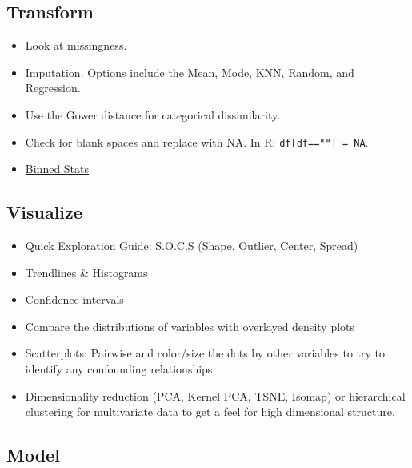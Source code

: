 \documentclass[]{book}
\theoremstyle{definition}
\theoremstyle{definition}
\theoremstyle{definition}
\theoremstyle{remark}
\begin{document}
\subsection{Transform}\label{transform}

\begin{itemize}
\item
  Look at missingness.
\item
  Imputation. Options include the Mean, Mode, KNN, Random, and
  Regression.
\item
  Use the Gower distance for categorical dissimilarity.
\item
  Check for blank spaces and replace with NA. In R:
  \texttt{df{[}df==""{]}\ =\ NA}.
\item
  \href{https://docs.scipy.org/doc/scipy-0.16.0/reference/generated/scipy.stats.binned_statistic.html}{Binned
  Stats}
\end{itemize}

\subsection{Visualize}\label{visualize}

\begin{itemize}
\item
  Quick Exploration Guide: S.O.C.S (Shape, Outlier, Center, Spread)
\item
  Trendlines \& Histograms
\item
  Confidence intervals
\item
  Compare the distributions of variables with overlayed density plots
\item
  Scatterplots: Pairwise and color/size the dots by other variables to
  try to identify any confounding relationships.
\item
  Dimensionality reduction (PCA, Kernel PCA, TSNE, Isomap) or
  hierarchical clustering for multivariate data to get a feel for high
  dimensional structure.
\end{itemize}

\subsection{Model}\label{model}
\end{document}
